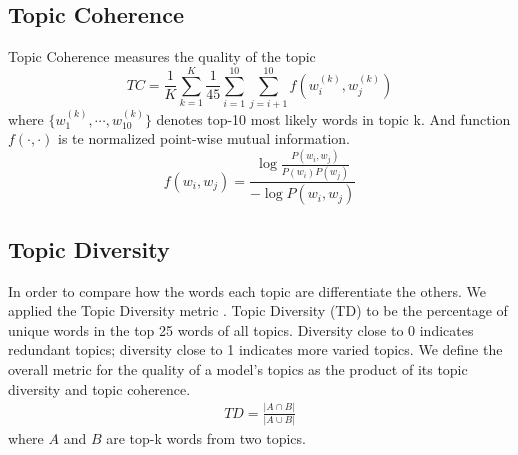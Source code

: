 \subsection{Topic Coherence}Topic Coherence\cite{mimno_optimizing_2011} measures the quality of the topic 
\begin{equation*}
TC=\frac{1}{K}\sum_{k=1}^{K}\frac{1}{45}\sum_{i=1}^{10}\sum_{j=i+1}^{10}f(w_i^{(k)},w_j^{(k)})\end{equation*}
where $\{w_1^{(k)},\cdots,w_{10}^{(k)}\}$ denotes top-10 most likely words in topic k. And function $f(\cdot,\cdot)$ is te normalized point-wise mutual information.\begin{equation*}
f(w_i,w_j)=\frac{\log\frac{P(w_i,w_j)}{P(w_i)P(w_j)}}{-\log P(w_i,w_j)}\end{equation*}
\subsection{Topic Diversity} In order to compare how the words each topic are differentiate the others. We applied the Topic Diversity metric \cite{dieng_topic_2019}. Topic Diversity (TD) to be the percentage of unique words in the top 25 words of all topics. Diversity close to 0 indicates redundant topics; diversity close to 1 indicates more varied topics. We define the overall metric for the quality of a model’s topics as the product of its topic diversity and topic coherence.
\begin{align*}
TD=\frac{|A\cap B|}{|A \cup B|}
\end{align*}
where $ A $ and $ B $ are top-k words from two topics. 